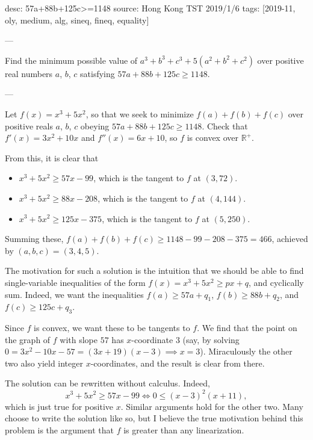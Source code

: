 desc: 57a+88b+125c>=1148
source: Hong Kong TST 2019/1/6
tags: [2019-11, oly, medium, alg, sineq, fineq, equality]

---

Find the minimum possible value of $a^3+b^3+c^3+5(a^2+b^2+c^2)$ over positive real numbers $a$, $b$, $c$ satisfying $57a+88b+125c\ge1148$.

---

Let $f(x)=x^3+5x^2$, so that we seek to minimize $f(a)+f(b)+f(c)$ over positive reals $a$, $b$, $c$ obeying $57a+88b+125c\ge1148$. Check that $f'(x)=3x^2+10x$ and $f''(x)=6x+10$, so $f$ is convex over $\mathbb R^+$.

From this, it is clear that
\begin{itemize}[itemsep=0em]
    \item $x^3+5x^2\ge57x-99$, which is the tangent to $f$ at $(3,72)$.
    \item $x^3+5x^2\ge88x-208$, which is the tangent to $f$ at $(4,144)$.
    \item $x^3+5x^2\ge125x-375$, which is the tangent to $f$ at $(5,250)$.
\end{itemize}
Summing these, $f(a)+f(b)+f(c)\ge1148-99-208-375=466$, achieved by $(a,b,c)=(3,4,5)$.
\begin{remark}
    The motivation for such a solution is the intuition that we should be able to find single-variable inequalities of the form $f(x)=x^3+5x^2\ge px+q$, and cyclically sum. Indeed, we want the inequalities $f(a)\ge 57a+q_1$, $f(b)\ge 88b+q_2$, and $f(c)\ge 125c+q_3$.

    Since $f$ is convex, we want these to be tangents to $f$. We find that the point on the graph of $f$ with slope $57$ has $x$-coordinate $3$ (say, by solving $0=3x^2-10x-57=(3x+19)(x-3)\implies x=3$). Miraculously the other two also yield integer $x$-coordinates, and the result is clear from there.
\end{remark}
\begin{remark}
    The solution can be rewritten without calculus. Indeed, \[x^3+5x^2\ge57x-99\iff0\le(x-3)^2(x+11),\]
    which is just true for positive $x$. Similar arguments hold for the other two. Many choose to write the solution like so, but I believe the true motivation behind this problem is the argument that $f$ is greater than any linearization.
\end{remark}

